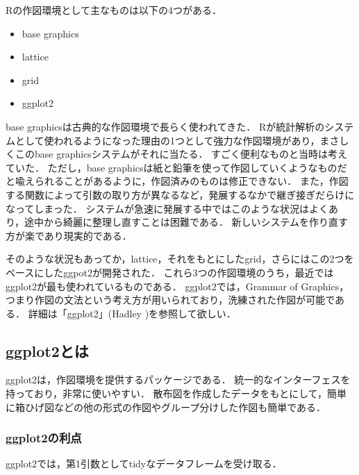 \documentclass[
]{article}
\providecommand{\tightlist}{%
  \setlength{\itemsep}{0pt}\setlength{\parskip}{0pt}}
\begin{document}
Rの作図環境として主なものは以下の4つがある．

\begin{itemize}
\tightlist
\item
  base graphics
\item
  lattice
\item
  grid
\item
  ggplot2
\end{itemize}

base graphicsは古典的な作図環境で長らく使われてきた．
Rが統計解析のシステムとして使われるようになった理由の1つとして強力な作図環境があり，まさしくこのbase graphicsシステムがそれに当たる．
すごく便利なものと当時は考えていた．
ただし，base graphicsは紙と鉛筆を使って作図していくようなものだと喩えられることがあるように，作図済みのものは修正できない．
また，作図する関数によって引数の取り方が異なるなど，発展するなかで継ぎ接ぎだらけになってしまった．
システムが急速に発展する中ではこのような状況はよくあり，途中から綺麗に整理し直すことは困難である．
新しいシステムを作り直す方が楽であり現実的である．

そのような状況もあってか，lattice，それをもとにしたgrid，さらにはこの2つをベースにしたggpot2が開発された．
これら3つの作図環境のうち，最近ではggplot2が最も使われているものである．
ggplot2では，Grammar of Graphics，つまり作図の文法という考え方が用いられており，洗練された作図が可能である．
詳細は「ggplot2」(Hadley )を参照して欲しい．

\hypertarget{ggplot2ux3068ux306f}{%
\subsection{ggplot2とは}\label{ggplot2ux3068ux306f}}

ggplot2は，作図環境を提供するパッケージである．
統一的なインターフェスを持っており，非常に使いやすい．
散布図を作成したデータをもとにして，簡単に箱ひげ図などの他の形式の作図やグループ分けした作図も簡単である．

\hypertarget{ggplot2ux306eux5229ux70b9}{%
\subsubsection{ggplot2の利点}\label{ggplot2ux306eux5229ux70b9}}

ggplot2では，第1引数としてtidyなデータフレームを受け取る．
\end{document}
